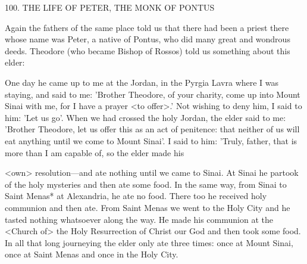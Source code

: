 100.
THE LIFE OF PETER, THE MONK OF PONTUS

Again the fathers of the same place told us that there had been a
priest there whose name was Peter, a native of Pontus, who did
many great and wondrous deeds.
Theodore (who became Bishop of
Rossos) told us something about this elder:

One day he came up to me at the Jordan, in the Pyrgia Lavra where
I was staying, and said to me: 'Brother Theodore, of your charity,
come up into Mount Sinai with me, for I have a prayer <to offer>.'
Not wishing to deny him, I said to him: 'Let us go'.
When we had
crossed the holy Jordan, the elder said to me: 'Brother Theodore, let
us offer this as an act of penitence: that neither of us will eat
anything until we come to Mount Sinai'.
I said to him: 'Truly,
father, that is more than I am capable of, so the elder made his

<own> resolution—and ate nothing until we came to Sinai.
At Sinai
he partook of the holy mysteries and then ate some food.
In the
same way, from Sinai to Saint Menas* at Alexandria, he ate no
food.
There too he received holy communion and then ate.
From
Saint Menas we went to the Holy City and he tasted nothing
whatsoever along the way.
He made his communion at the <Church
of> the Holy Resurrection of Christ our God and then took some
food.
In all that long journeying the elder only ate three times: once
at Mount Sinai, once at Saint Menas and once in the Holy City.

